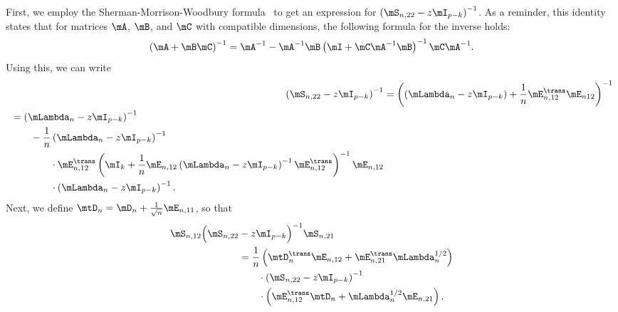 First, we employ the Sherman-Morrison-Woodbury formula~\cite{golub1996mc} to  get an expression for $\left(\mS_{n,22} - z \mI_{p-k}\right)^{-1}$.  As a reminder, this identity states that for matrices $\mA$, $\mB$, and $\mC$ with compatible dimensions, the following formula for the inverse holds:
\[
    \left(
        \mA
        +
        \mB
        \mC
    \right)^{-1}
        =
        \mA^{-1}
        -
        \mA^{-1}
        \mB
        \left(
            \mI
            +
            \mC
            \mA^{-1}
            \mB
        \right)^{-1}
        \mC
        \mA^{-1}.
\]
Using this, we can write
\begin{align}\label{E:lowrank-smw-expansion}
    \left(
        \mS_{n,22} - z \mI_{p-k}
    \right)^{-1}
        &=
            \left(
                \left(
                    \mLambda_n - z \mI_{p-k}
                \right)
                +
                \frac{1}{n}
                \mE_{n,12}^\trans \mE_{n12}
            \right)^{-1} \notag \\
        \begin{split}
        &=
            \left(
                \mLambda_n
                -
                z
                \mI_{p-k}
            \right)^{-1} \\
            &\qquad-
            \frac{1}{n}
            \left(
                \mLambda_n
                -
                z
                \mI_{p-k}
            \right)^{-1} \\
            &\qquad\qquad\cdot
            \mE_{n,12}^\trans
            \left(
                \mI_k
                +
                \frac{1}{n}
                \mE_{n,12}
                \left(
                    \mLambda_n
                    -
                    z
                    \mI_{p-k}
                \right)^{-1}
                \mE_{n,12}^\trans
            \right)^{-1}
            \mE_{n,12} \\
            &\qquad\qquad\cdot
            \left(
                \mLambda_n
                -
                z
                \mI_{p-k}
            \right)^{-1}.
    \end{split}
\end{align}
Next, we define $\mtD_n = \mD_n + \frac{1}{\sqrt{n}} \mE_{n,11}$, so that
\begin{align}\label{E:lowrank-S-schur}
    \begin{split}
    \mS_{n,12} 
    \Big(
        \mS_{n,22} &- z \mI_{p-k}
    \Big)^{-1}
    \mS_{n,21} \\
        &=
            \frac{1}{n}
            \left(
                \mtD_n^\trans \mE_{n,12}
                +
                \mE_{n,21}^\trans \mLambda_n^{1/2}
            \right) \\
            &\qquad\cdot
            \left(
                \mS_{n,22} - z \mI_{p-k}
            \right)^{-1} \\
            &\qquad\cdot
            \left(
                \mE_{n,12}^\trans \mtD_n
                +
                \mLambda_n^{1/2} \mE_{n,21}
            \right).
    \end{split}
\end{align}

